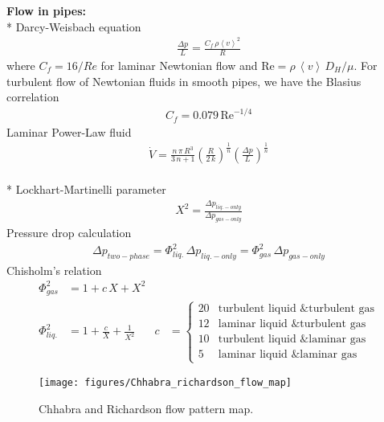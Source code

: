 \documentclass[calculator,datasheet,handbook]{exam}
\begin{document}
\begin{datasheet}
  {\bf Flow in pipes:}\\*
  Darcy-Weisbach equation
  \begin{align}
    \frac{\Delta p}{L} = \frac{C_f\,\rho\left\langle v\right\rangle^2}{R}
  \end{align}
  where $C_f=16/Re$ for laminar Newtonian flow and
  $\text{Re}=\rho\,\left\langle v\right\rangle\,D_H/\mu$.  For
  turbulent flow of Newtonian fluids in smooth pipes, we have the
  Blasius correlation
  \begin{align*}
    C_f=0.079\,\text{Re}^{-1/4}
  \end{align*}
  Laminar Power-Law fluid
  \begin{align}
    \dot{V} = \frac{n\,\pi\,R^3}{3\,n+1} \left(\frac{R}{2\,k}\right)^{\frac{1}{n}} \left(\frac{\Delta p}{L}\right)^{\frac{1}{n}}
  \end{align}
  \\*
  Lockhart-Martinelli parameter
  \begin{align*}
    X^2=\frac{\Delta p_{liq.-only}}{\Delta p_{gas-only}}
  \end{align*}
  Pressure drop calculation
  \begin{align*}
    \Delta p_{two-phase} = \Phi^2_{liq.}\,\Delta p_{liq.-only} = \Phi^2_{gas}\,\Delta p_{gas-only}
  \end{align*}
  Chisholm's relation
  \begin{align*}
    \Phi^2_{gas} &= 1 + c\,X + X^2 &\\
    \Phi^2_{liq.} &= 1 + \frac{c}{X}+\frac{1}{X^2} &
    c &= \begin{cases}
      20& \text{turbulent liquid \& turbulent gas}\\
      12& \text{laminar liquid \& turbulent gas}\\
      10& \text{turbulent liquid \& laminar gas}\\
      5& \text{laminar liquid \& laminar gas}
    \end{cases}
  \end{align*}
  \begin{figure}[ht!]%
    \begin{center}%
      \texttt{[image: figures/Chhabra\_richardson\_flow\_map]}
    \end{center}
    \caption{Chhabra and Richardson flow pattern map.}
  \end{figure}


\end{datasheet}
\end{document}
